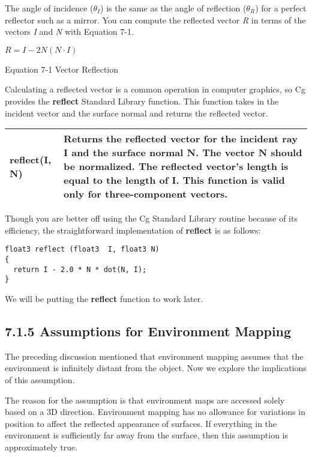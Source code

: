 \documentclass[../main.tex]{subfiles}
\begin{document}
The angle of incidence ($\theta_I$) is the same as the angle of reflection ($\theta_R $) for a perfect reflector such as a mirror. You can compute the reflected vector \textit{R} in terms of the vectors \textit{I} and \textit{N} with Equation 7-1.

\FloatBarrier
\begin{equationcaption}
$
R = I - 2N(N \cdot I)
$
\caption{Equation 7-1 Vector Reflection}
\end{equationcaption}
\FloatBarrier

Calculating a reflected vector is a common operation in computer graphics, so Cg provides the \textbf{reflect} Standard Library function. This function takes in the incident vector and the surface normal and returns the reflected vector.

\FloatBarrier
\begin{table}
\centering
\begin{tabular}{ p{3cm} p{10cm}  } 
\hline
\textbf{reflect(I, N)} & Returns the reflected vector for the incident ray \textbf{I} and the surface normal \textbf{N}. The vector \textbf{N} should be normalized. The reflected vector's length is equal to the length of \textbf{I}. This function is valid only for three-component vectors. \\
\hline
\end{tabular}
\end{table}
\FloatBarrier

Though you are better off using the Cg Standard Library routine because of its efficiency, the straightforward implementation of \textbf{reflect} is as follows:

\FloatBarrier
\begin{lstlisting}
float3 reflect (float3  I, float3 N)
{
  return I - 2.0 * N * dot(N, I);
}
\end{lstlisting}
\FloatBarrier

We will be putting the \textbf{reflect} function to work later.

\subsection{7.1.5 Assumptions for Environment Mapping}

The preceding discussion mentioned that environment mapping assumes that the environment is infinitely distant from the object. Now we explore the implications of this assumption.

The reason for the assumption is that environment maps are accessed solely based on a 3D direction. Environment mapping has no allowance for variations in position to affect the reflected appearance of surfaces. If everything in the environment is sufficiently far away from the surface, then this assumption is approximately true.
\end{document}

